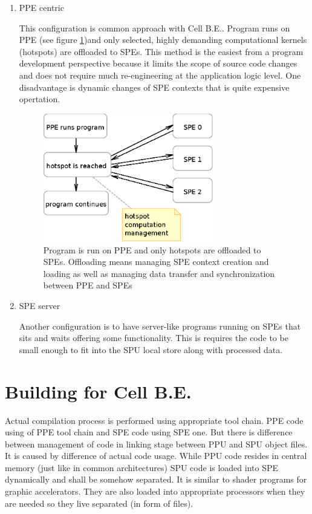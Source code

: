 \begin{enumerate}
\item PPE centric
\par
This configuration is common approach with Cell B.E..
Program runs on PPE (see figure \ref{fg:PPUCentricModel})and only selected, highly demanding computational kernels (hotspots) are offloaded to SPEs.
This method is the easiest from a program development perspective because it limits the scope of source code changes and does not require much re-engineering at the application logic level.
One disadvantage is dynamic changes of SPE contexts that is quite expensive opertation.

\begin{figure}
    \centering
    \includegraphics[width=0.7\textwidth]{data/PPUCentricModel}
    \caption[PPU centric configuration]{Program is run on PPE and only hotspots are offloaded to SPEs.
 Offloading means managing SPE context creation and loading as well as managing data transfer and synchronization between PPE and SPEs}
    \label{fg:PPUCentricModel}
\end{figure}

\item SPE server
\par
Another configuration is to have server-like programs running on SPEs that sits and waits offering some functionality.
 This is requires the code to be small enough to fit into the SPU local store along with processed data.

\end{enumerate}

\section {Building for Cell B.E.}
\par
Actual compilation process is performed using appropriate tool chain.
PPE code using of PPE tool chain and SPE code using SPE one.
But there is difference between management of code in linking stage between PPU and SPU object files.
It is caused by difference of actual code usage.
While PPU code resides in central memory (just like in common architectures) SPU code is loaded into SPE dynamically and shall be somehow separated.
It is similar to shader programs for graphic accelerators.
They are also loaded into appropriate processors when they are needed so they live separated (in form of files).

